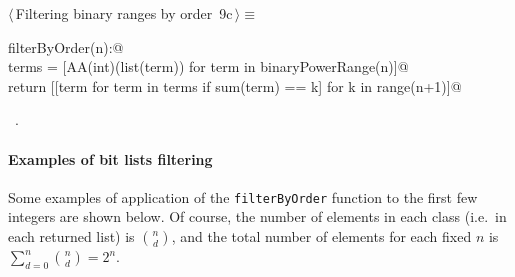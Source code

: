 \documentclass[11pt,oneside]{article}	%
\begin{document}
\begin{flushleft} \small \label{scrap13}
\protect{}$\langle\,$Filtering binary ranges by order\nobreak\ {\footnotesize 9c}$\,\rangle\equiv$
\vspace{-1ex}
\begin{list}{}{} \item
\mbox{}\verb@def filterByOrder(n):@\\
\mbox{}\verb@    terms = [AA(int)(list(term)) for term in binaryPowerRange(n)]@\\
\mbox{}\verb@    return [[term for term in terms if sum(term) == k] for k in range(n+1)]@\\
\mbox{}\verb@@{\NWsep}
\end{list}
\vspace{-1ex}
\footnotesize\addtolength{\baselineskip}{-1ex}
\begin{list}{}{\setlength{\itemsep}{-\parsep}\setlength{\itemindent}{-\leftmargin}}
\item \NWtxtMacroRefIn\ .
\end{list}
\end{flushleft}

\paragraph{Examples of bit lists filtering}
Some examples of application of the \texttt{filterByOrder} function to the first few integers are shown below.
Of course, the number of elements in each class (i.e.~in each returned list) is ${n \choose d}$, and the total number of elements for each fixed $n$ is $\sum_{d=0}^n {n \choose d} = 2^n$.
\end{document}
